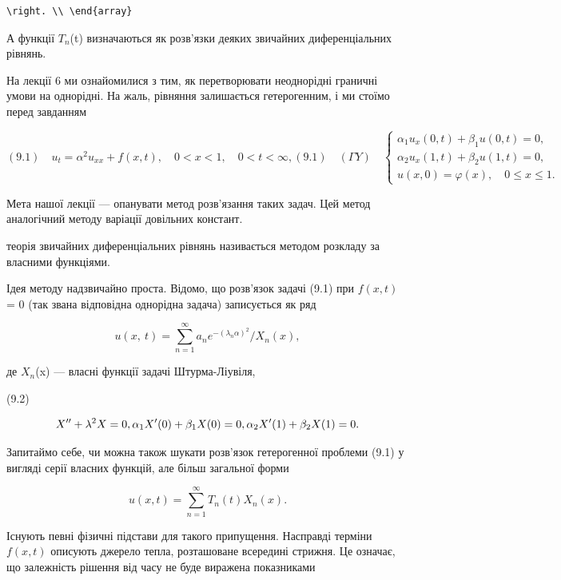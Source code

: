 \documentclass[
  ukrainian,
]{article}
\begin{document}
\begin{verbatim}
\right. \\ \end{array}
\end{verbatim}

А функції \(T_n\)(t) визначаються як розв'язки деяких звичайних
диференціальних рівнянь.

На лекції 6 ми ознайомилися з тим, як перетворювати неоднорідні граничні
умови на однорідні. На жаль, рівняння залишається гетерогенним, і ми
стоїмо перед завданням

\[
(9.1) \quad u_{t} = \alpha^{2} u_{xx} + f(x, t), \quad 0 < x < 1, \quad 0 < t < \infty,
(9.1) \quad (\Gamma Y) \quad
\begin{cases} \alpha_{1} u_{x}(0, t) + \beta_{1} u(0, t) = 0, \\ \alpha_{2} u_{x}(1, t) + \beta_{2} u(1, t) = 0, \\ u(x, 0) = \varphi(x), \quad 0 \le x \le 1. \end{cases}
\]

Мета нашої лекції --- опанувати метод розв'язання таких задач. Цей метод
аналогічний методу варіації довільних констант.

теорія звичайних диференціальних рівнянь називається методом розкладу за
власними функціями.

Ідея методу надзвичайно проста. Відомо, що розв'язок задачі (9.1) при
\(f(x, t)\) = 0 (так звана відповідна однорідна задача) записується як
ряд

\[
u\left(x,\ t\right)=\sum_{n=1}^{\infty}a_{n}e^{-\left(\lambda_{n}\alpha\right)^{2}}/X_{n}\left(x\right),
\]

де \(X_n\)(x) --- власні функції задачі Штурма-Ліувіля,

(9.2)

\[
X'' + \lambda^2 X = 0, \\ \alpha_1 X'(0) + \beta_1 X(0) = 0, \\ \alpha_2 X'(1) + \beta_2 X(1) = 0.
\]

Запитаймо себе, чи можна також шукати розв'язок гетерогенної проблеми
(9.1) у вигляді серії власних функцій, але більш загальної форми

\[
u(x, t) = \sum_{n=1}^{\infty} T_n(t) X_n(x).
\]

Існують певні фізичні підстави для такого припущення. Насправді терміни
\(f(x,t)\) описують джерело тепла, розташоване всередині стрижня. Це
означає, що залежність рішення від часу не буде виражена показниками
\end{document}
